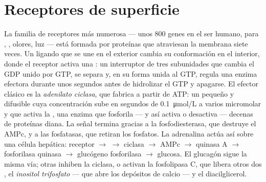 \section{Receptores de superficie}

\begin{proposition}\label{prop:b2:cell-signalling:gpcr}
La familia de receptores más numerosa --- unos \num{800} genes en el ser
humano, para , , olores, luz --- está formada por
proteínas que atraviesan la membrana siete veces. Un ligando que se une en
el exterior cambia su conformación en el interior, donde el receptor
activa una \emph{}: un interruptor de tres subunidades que cambia el GDP
unido por GTP, se separa y, en su forma unida al GTP, regula una enzima
efectora durante unos segundos antes de hidrolizar el GTP y apagarse. El
efector clásico es la \emph{adenilato ciclasa}, que fabrica \emph{} a partir de ATP: un \emph{} pequeño y difusible
cuya concentración sube en segundos de \qty{0.1}{\micro mol/L} a varios
micromolar y que activa la \emph{}, una enzima que
fosforila --- y así activa o desactiva --- decenas de proteínas diana. La
señal termina gracias a la fosfodiesterasa, que destruye el AMPc, y a las
fosfatasas, que retiran los fosfatos. La adrenalina actúa así sobre una
célula hepática: receptor $\to$ 
$\to$ ciclasa $\to$ AMPc $\to$ quinasa A $\to$ fosforilasa quinasa
$\to$ glucógeno fosforilasa $\to$ glucosa. El glucagón sigue la misma
vía; otras  inhiben la ciclasa, o activan la fosfolipasa C,
que libera otros dos , el \emph{inositol trifosfato}
--- que abre los depósitos de calcio --- y el diacilglicerol.
\end{proposition}
